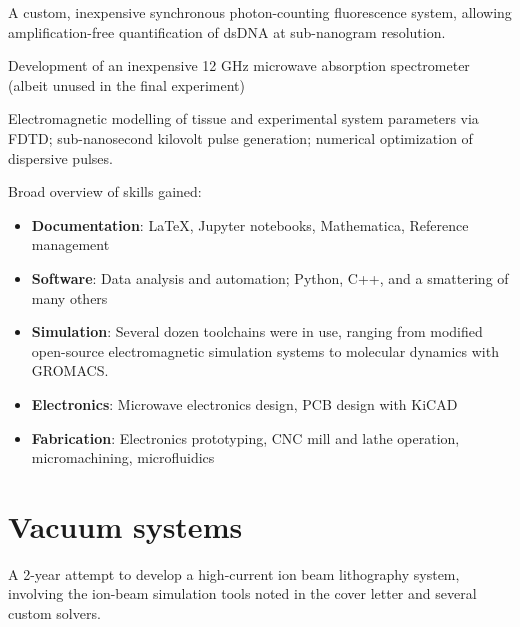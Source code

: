 \documentclass[fleqn,11pt]{article}
\begin{document}
{\begin{multicols}{1}
A custom, inexpensive synchronous photon-counting fluorescence system, allowing amplification-free quantification of dsDNA at sub-nanogram resolution.

Development of an inexpensive 12 GHz microwave absorption spectrometer (albeit unused in the final experiment)

Electromagnetic modelling of tissue and experimental system parameters via FDTD; sub-nanosecond kilovolt pulse generation; numerical optimization of dispersive pulses.
%
%

Broad overview of skills gained:
\begin{itemize}
	\item \textbf{Documentation}: LaTeX, Jupyter notebooks, Mathematica, Reference management
	\item \textbf{Software}: Data analysis and automation; Python, C++, and a smattering of many others
	\item \textbf{Simulation}: Several dozen toolchains were in use, ranging from modified open-source electromagnetic simulation systems to molecular dynamics with GROMACS.
	\item \textbf{Electronics}: Microwave electronics design, PCB design with KiCAD
	\item \textbf{Fabrication}: Electronics prototyping, CNC mill and lathe operation, micromachining, microfluidics
\end{itemize}


\section*{Vacuum systems}

A 2-year attempt to develop a high-current ion beam lithography system, involving the ion-beam simulation tools noted in the cover letter and several custom solvers.
	
\end{multicols}


}
\end{document}
